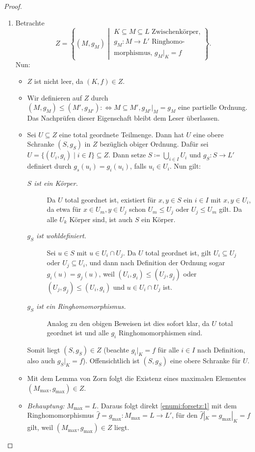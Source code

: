 \documentclass[12pt,a4paper]{scrartcl}
\begin{document}
\begin{proof}
	\leavevmode
	\begin{enumerate}
		\item Betrachte
		\[Z =\left\{(M, g_M) \middle| \substack{\text{$K\subseteq M\subseteq L$ Zwischenkörper,}\\\text{$g_M\colon M\to L'$ Ringhomo-}\\\text{morphismus, $g_M|_K = f$}}\right\}.\]
		Nun: \begin{itemize}
			\item $Z$ ist nicht leer, da $(K,f)\in Z$.
			\item Wir definieren auf $Z$ durch $(M, g_M)\leq (M',g_{M'}):\Leftrightarrow M\subseteq M', g_{M'}|_M = g_M$ eine partielle Ordnung. Das Nachprüfen dieser Eigenschaft bleibt dem Leser überlassen.
			\item Sei $U\subseteq Z$ eine total geordnete Teilmenge. Dann hat $U$ eine obere Schranke $(S, g_S)$ in $Z$ bezüglich obiger Ordnung. Dafür sei $U  = \{(U_i,g_i)\mid i\in I\}\subseteq Z$. Dann setze $S \coloneqq \bigcup_{i\in I} U_i$ und $g_S\colon S\to L'$ definiert durch $g_s(u_i) = g_i(u_i)$, falls $u_i\in U_i$. Nun gilt:
			\begin{description}
				\item[\emph{$S$ ist ein Körper.}] Da $U$ total geordnet ist, existiert für $x,y\in S$ ein $i\in I$ mit $x,y\in U_i$, da etwa für $x\in U_m, y\in U_j$ schon $U_m\leq U_j$ oder $U_j\leq U_m$ gilt. Da alle $U_k$ Körper sind, ist auch $S$ ein Körper.
				\item[\emph{$g_S$ ist wohldefiniert.}] Sei $u\in S$ mit $u\in U_i\cap U_j$. Da $U$ total geordnet ist, gilt $U_i\subseteq U_j$ oder $U_j\subseteq U_i$, und dann nach Definition der Ordnung sogar $g_i(u) = g_j(u)$, weil $(U_i,g_i)\leq (U_j, g_j)$ oder $(U_j,g_j)\leq (U_i,g_i)$ und $u\in U_i\cap U_j$ ist.
				\item[\emph{$g_S$ ist ein Ringhomomorphismus.}] Analog zu den obigen Beweisen ist dies sofort klar, da $U$ total geordnet ist und alle $g_i$ Ringhomomorphismen sind.
			\end{description}
			Somit liegt $(S, g_S)\in Z$ (beachte $g_i|_K = f$ für alle $i\in I$ nach Definition, also auch $g_S|_K = f$). Offensichtlich ist $(S,g_S)$ eine obere Schranke für $U$.
			\item Mit dem Lemma von Zorn folgt die Existenz eines maximalen Elementes $(M_{\max}, g_{\max})\in Z$.
			\item \emph{Behauptung:} $M_{\max} = L$. Daraus folgt direkt \ref{enumi:forsetz:1} mit dem Ringhomomorphismus $\hat{f} = g_{\max}\colon M_{\max} = L\to L'$, für den $\hat{f}|_K = g_{\max}|_K = f$ gilt, weil $(M_{\max}, g_{\max})\in Z$ liegt.

\end{itemize}
\end{enumerate}
\end{proof}
\end{document}
